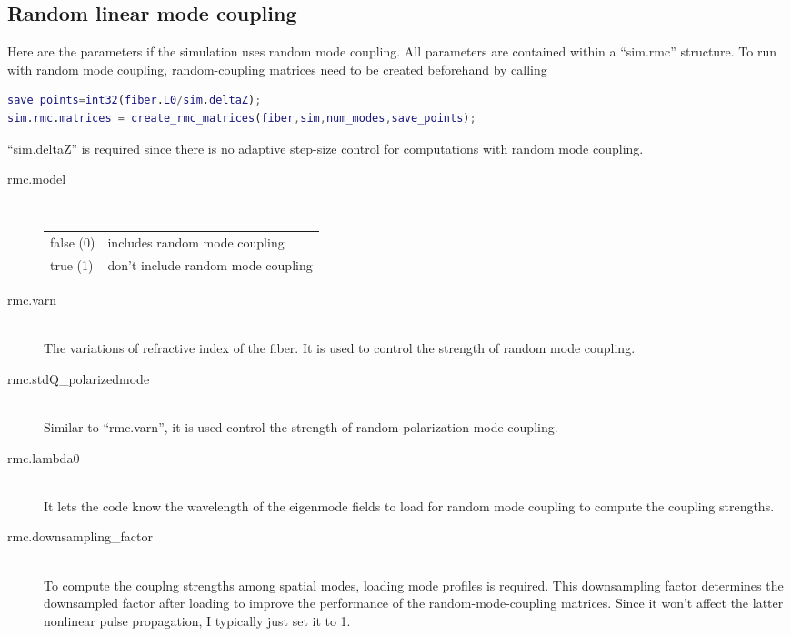 \documentclass[12pt,hidelinks]{book}
\begin{document}
\subsection{Random linear mode coupling}
Here are the parameters if the simulation uses random mode coupling. All parameters are contained within a ``sim.rmc'' structure. To run with random mode coupling, random-coupling matrices need to be created beforehand by calling
\begin{lstlisting}[language=MATLAB]
save_points=int32(fiber.L0/sim.deltaZ);
sim.rmc.matrices = create_rmc_matrices(fiber,sim,num_modes,save_points);
\end{lstlisting}
``sim.deltaZ'' is required since there is no adaptive step-size control for computations with random mode coupling.

\begin{description}
\item[\color{blue}rmc.model]\mbox{}\\
\begin{tabular}{ll}
false (0) & includes random mode coupling \\
true (1) & don't include random mode coupling
\end{tabular}

\item[rmc.varn]\mbox{}\\
The variations of refractive index of the fiber. It is used to control the strength of random mode coupling.

\item[rmc.stdQ\_polarizedmode]\mbox{}\\
Similar to ``rmc.varn'', it is used control the strength of random polarization-mode coupling.

\item[rmc.lambda0]\mbox{}\\
It lets the code know the wavelength of the eigenmode fields to load for random mode coupling to compute the coupling strengths.

\item[rmc.downsampling\_factor]\mbox{}\\
To compute the couplng strengths among spatial modes, loading mode profiles is required. This downsampling factor determines the downsampled factor after loading to improve the performance of the random-mode-coupling matrices. Since it won't affect the latter nonlinear pulse propagation, I typically just set it to \num{1}.
\end{description}
\end{document}
